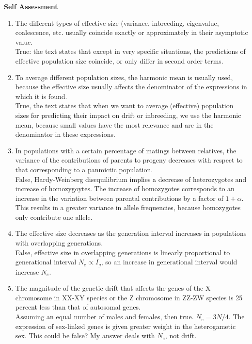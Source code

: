 \documentclass[12pt]{amsart}
\begin{document}
{\large \bf Self Assessment}
\begin{enumerate}
\item The different types of effective size (variance, inbreeding, eigenvalue, coalescence, etc. usually coincide exactly or approximately in their asymptotic value.\\
True: the text states that except in very specific situations, the predictions of effective population size coincide, or only differ in second order terms.\\
\item To average different population sizes, the harmonic mean is usually used, because the effective size usually affects the denominator of the expressions in which it is found.\\
True, the text states that when we want to average (effective) population sizes for predicting their impact on drift or inbreeding, we use the harmonic mean, because small values have the most relevance and are in the denominator in these expressions. \\
\item In populations with a certain percentage of matings between relatives, the variance of the contributions of parents to progeny decreases with respect to that corresponding to a panmictic population.\\
False, Hardy-Weinberg disequilibrium implies a decrease of heterozygotes and increase of homozygoytes. The increase of homozygotes corresponds to an increase in the variation between parental contributions by a factor of $1 + \alpha$. This results in a greater variance in allele frequencies, because homozygotes only contribute one allele. \\
\item The effective size decreases as the generation interval increases in populations with overlapping generations.\\
False, effective size in overlapping generations is linearly proportional to generational interval $N_e \propto I_g$, so an increase in generational interval would increase $N_e$.\\
\item The magnitude of the genetic drift that affects the genes of the X chromosome in XX-XY species or the Z chromosome in ZZ-ZW species is 25 percent less than that of autosomal genes.\\
Assuming an equal number of males and females, then true. $N_e = 3N/4$. The expression of sex-linked genes is given greater weight in the heterogametic sex. This could be false? My answer deals with $N_e$, not drift.\\

\end{enumerate}
\end{document}
